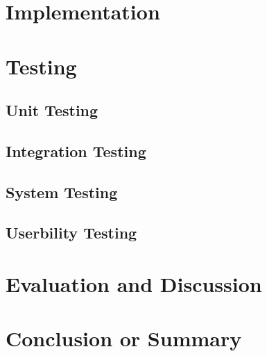 \documentclass[11pt]{cmpreport}
\begin{document}
\section{Implementation}

\section{Testing}

\subsection{Unit Testing}

\subsection{Integration Testing}

\subsection{System Testing}

\subsection{Userbility Testing}


\section{Evaluation and Discussion}

\section{Conclusion or Summary}


%
 
\end{document}

